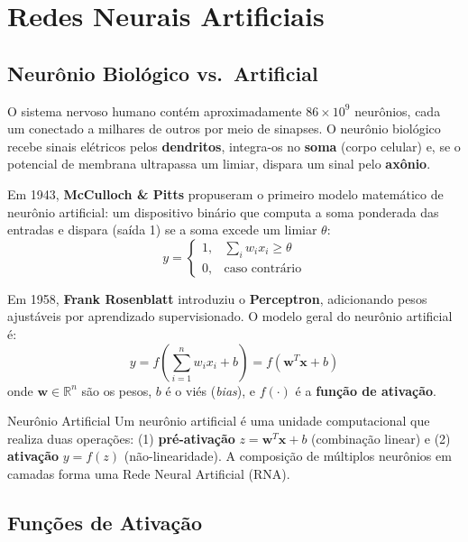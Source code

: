 \documentclass[12pt,a4paper]{article}
\begin{document}
\section{Redes Neurais Artificiais}

\subsection{Neurônio Biológico vs.\ Artificial}

O sistema nervoso humano contém aproximadamente $86 \times 10^9$ neurônios, cada um conectado a milhares de outros por meio de sinapses. O neurônio biológico recebe sinais elétricos pelos \textbf{dendritos}, integra-os no \textbf{soma} (corpo celular) e, se o potencial de membrana ultrapassa um limiar, dispara um sinal pelo \textbf{axônio}.

Em 1943, \textbf{McCulloch \& Pitts} propuseram o primeiro modelo matemático de neurônio artificial: um dispositivo binário que computa a soma ponderada das entradas e dispara (saída 1) se a soma excede um limiar $\theta$:
\[
  y = \begin{cases} 1, & \sum_i w_i x_i \geq \theta \\ 0, & \text{caso contrário} \end{cases}
\]

Em 1958, \textbf{Frank Rosenblatt} introduziu o \textbf{Perceptron}, adicionando pesos ajustáveis por aprendizado supervisionado. O modelo geral do neurônio artificial é:
\[
  y = f\!\left(\sum_{i=1}^{n} w_i x_i + b\right) = f\!\left(\mathbf{w}^T \mathbf{x} + b\right)
\]
onde $\mathbf{w} \in \mathbb{R}^n$ são os pesos, $b$ é o viés (\textit{bias}), e $f(\cdot)$ é a \textbf{função de ativação}.

\begin{definicaobox}{Neurônio Artificial}
Um neurônio artificial é uma unidade computacional que realiza duas operações: (1) \textbf{pré-ativação} $z = \mathbf{w}^T\mathbf{x} + b$ (combinação linear) e (2) \textbf{ativação} $y = f(z)$ (não-linearidade). A composição de múltiplos neurônios em camadas forma uma Rede Neural Artificial (RNA).
\end{definicaobox}

\subsection{Funções de Ativação}
\end{document}
